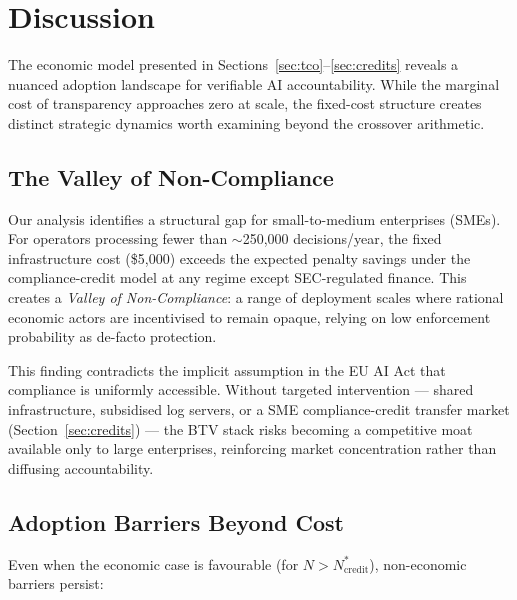\section{Discussion}
\label{sec:discussion}

The economic model presented in Sections~\ref{sec:tco}--\ref{sec:credits}
reveals a nuanced adoption landscape for verifiable AI accountability.
While the marginal cost of transparency approaches zero at scale, the
fixed-cost structure creates distinct strategic dynamics worth examining
beyond the crossover arithmetic.

\subsection{The Valley of Non-Compliance}
\label{subsec:valley}

Our analysis identifies a structural gap for small-to-medium enterprises
(SMEs). For operators processing fewer than $\sim$250{,}000
decisions/year, the fixed infrastructure cost (\$5{,}000) exceeds
the expected penalty savings under the compliance-credit model at any
regime except SEC-regulated finance. This creates a \emph{Valley of
Non-Compliance}: a range of deployment scales where rational economic
actors are incentivised to remain opaque, relying on low enforcement
probability as de-facto protection.

This finding contradicts the implicit assumption in the EU AI Act that
compliance is uniformly accessible. Without targeted intervention ---
shared infrastructure, subsidised log servers, or a SME compliance-credit
transfer market (Section~\ref{sec:credits}) --- the BTV stack risks
becoming a competitive moat available only to large enterprises,
reinforcing market concentration rather than diffusing accountability.

\subsection{Adoption Barriers Beyond Cost}
\label{subsec:barriers}

Even when the economic case is favourable (for $N > N^*_{\text{credit}}$),
non-economic barriers persist:

